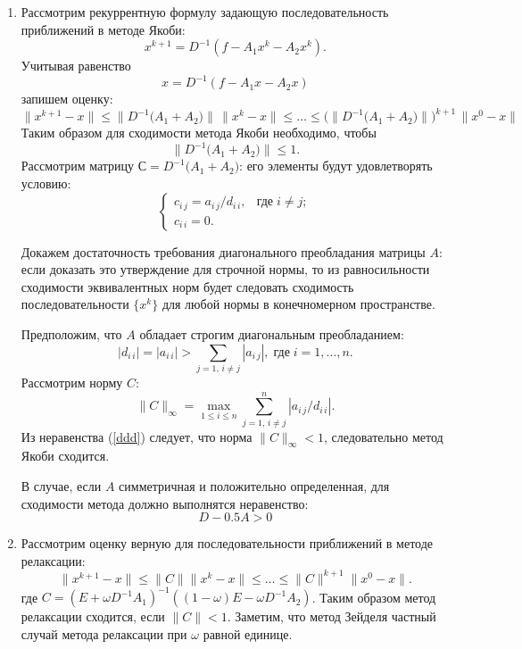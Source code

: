 \documentclass[12pt, a4paper]{article}
\newcommand{\norm}[1]{\lVert #1 \rVert}
\begin{document}
\begin{enumerate}
\begin{enumerate}
			
			\item Рассмотрим рекуррентную формулу задающую последовательность приближений в методе Якоби:
			\begin{equation}
				\label{eq:рекурентная-формула-якоби-КВ}
				x^{k+1} = D^{-1}(f - A_1 x^k - A_2 x^k ). 
			\end{equation}
			Учитывая равенство
			\[
			x = D^{-1}(f - A_1 x - A_2 x ) 
			\]
			запишем оценку:
			\[
			\norm{x^{k+1} - x} \le  \norm{D^{-1} \bigl(A_1 + A_2\bigr)} \, \norm{x^k - x} \le \ldots \le  \bigl(\norm{D^{-1}\bigl( A_1 + A_2\bigr)}\bigr)^{k+1} \, \norm{x^0 - x}
			\]
			Таким образом для сходимости метода Якоби необходимо, чтобы
			  \[
			  	\norm{D^{-1} \bigl(A_1 + A_2\bigr)} \le 1.
			  \]
			Рассмотрим матрицу $С = D^{-1} \bigl(A_1 + A_2\bigr)$: его элементы будут удовлетворять условию:
			\[
			\begin{cases}
			c_{i \, j} = a_{i \, j} / d_{i \, i}, & \text{где} \; i \neq j; \\
			c_{i \, i} = 0.
			\end{cases}
			\]
			
			Докажем достаточность требования диагонального преобладания матрицы $A$: если доказать это утверждение для строчной нормы, то из равносильности сходимости эквивалентных норм будет следовать сходимость последовательности $\{x^k\}$ для любой нормы в конечномерном пространстве.
			
			Предположим, что $A$ обладает строгим диагональным преобладанием:
			\begin{equation}
				\label{ddd}
				|d_{i \, i}| = |a_{i \, i}| > \sum_{j=1, \, i \neq j}|a_{i \, j}|, \; \text{где} \; i = 1,\ldots,n.
			\end{equation}
			Рассмотрим норму $C$:
			\[
			\norm{C}_\infty = \max_{1\le i\le n}\sum_{j=1, \, i \neq j}^{n} |a_{i \, j} / d_{i \, i}|.
			\]
			Из неравенства (\ref{ddd}) следует, что норма $\norm{C}_\infty < 1$, следовательно метод Якоби сходится.
			
			В случае, если $A$ симметричная и положительно определенная, для сходимости метода должно выполнятся неравенство:
			\[
				D - 0.5 A > 0
			\]
			\item Рассмотрим оценку верную для последовательности приближений в методе релаксации:
			\begin{equation}
				\label{eq:рекурентная-формула-релаксация-КВ}
				\norm{x^{k+1} - x} \le \norm{C}\norm{x^{k} - x} \le \ldots \le \norm{C}^{k+1} \norm{x^{0} - x}. 
			\end{equation}
			 где $C = (E + \omega D ^{-1}A_1)^{-1} ((1-\omega)E - \omega D ^{-1}A_2)$. Таким образом метод релаксации сходится, если $\norm{C}< 1$. Заметим, что метод Зейделя частный случай метода релаксации при $\omega$ равной единице.
			 

\end{enumerate}
\end{enumerate}
\end{document}
